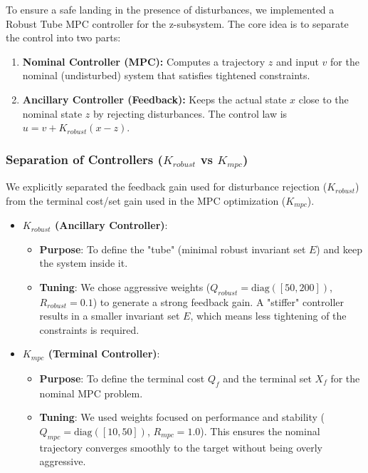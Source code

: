 \documentclass{article}
\begin{document}
To ensure a safe landing in the presence of disturbances, we implemented a Robust Tube MPC controller for the z-subsystem. The core idea is to separate the control into two parts:
\begin{enumerate}
    \item \textbf{Nominal Controller (MPC):} Computes a trajectory $z$ and input $v$ for the nominal (undisturbed) system that satisfies tightened constraints.
    \item \textbf{Ancillary Controller (Feedback):} Keeps the actual state $x$ close to the nominal state $z$ by rejecting disturbances. The control law is $u = v + K_{robust}(x - z)$.
\end{enumerate}

\subsubsection*{Separation of Controllers ($K_{robust}$ vs $K_{mpc}$)}

We explicitly separated the feedback gain used for disturbance rejection ($K_{robust}$) from the terminal cost/set gain used in the MPC optimization ($K_{mpc}$).

\begin{itemize}
    \item \textbf{$K_{robust}$ (Ancillary Controller)}:
    \begin{itemize}
        \item \textbf{Purpose}: To define the "tube" (minimal robust invariant set $E$) and keep the system inside it.
        \item \textbf{Tuning}: We chose aggressive weights ($Q_{robust} = \text{diag}([50, 200])$, $R_{robust} = 0.1$) to generate a strong feedback gain. A "stiffer" controller results in a smaller invariant set $E$, which means less tightening of the constraints is required.
    \end{itemize}
    
    \item \textbf{$K_{mpc}$ (Terminal Controller)}:
    \begin{itemize}
        \item \textbf{Purpose}: To define the terminal cost $Q_f$ and the terminal set $X_f$ for the nominal MPC problem.
        \item \textbf{Tuning}: We used weights focused on performance and stability ($Q_{mpc} = \text{diag}([10, 50])$, $R_{mpc} = 1.0$). This ensures the nominal trajectory converges smoothly to the target without being overly aggressive.
    \end{itemize}
\end{itemize}
\end{document}
